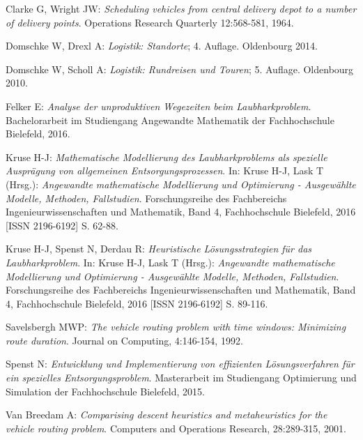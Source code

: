 \documentclass[fontsize=12pt,doubleside,openany,listof=totoc,listof=flat,listof=nochaptergap,numbers=noenddot]{scrbook}
\theoremstyle{style}
\begin{document}
\begin{thebibliography}{16}


 Clarke G, Wright JW: \textit{Scheduling vehicles from central delivery depot to a number of delivery points}. Operations Research Quarterly 12:568-581, 1964.

 Domschke W, Drexl A: \textit{Logistik: Standorte}; 4. Auflage. Oldenbourg 2014.

 Domschke W, Scholl A: \textit{Logistik: Rundreisen und Touren}; 5. Auflage. Oldenbourg 2010.

 Felker E: \textit{Analyse der unproduktiven Wegezeiten beim Laubharkproblem}. Bachelorarbeit im Studiengang Angewandte Mathematik der Fachhochschule Bielefeld, 2016.

 Kruse H-J: \textit{Mathematische Modellierung des Laubharkproblems als spezielle Ausprägung von allgemeinen Entsorgungsprozessen}. In: Kruse H-J, Lask T (Hrsg.): \textit{Angewandte mathematische Modellierung und Optimierung - Ausgewählte Modelle, Methoden, Fallstudien}. Forschungsreihe des Fachbereichs Ingenieurwissenschaften und Mathematik, Band 4, Fachhochschule Bielefeld, 2016 [ISSN 2196-6192] S. 62-88.

 Kruse H-J, Spenst N, Derdau R: \textit{Heuristische Lösungsstrategien für das Laubharkproblem}. In: Kruse H-J, Lask T (Hrsg.): \textit{Angewandte mathematische Modellierung und Optimierung - Ausgewählte Modelle, Methoden, Fallstudien}. Forschungsreihe des Fachbereichs Ingenieurwissenschaften und Mathematik, Band 4, Fachhochschule Bielefeld, 2016 [ISSN 2196-6192] S. 89-116.

 Savelsbergh MWP: \textit{The vehicle routing problem with time windows: Minimizing route duration}. Journal on Computing, 4:146-154, 1992.

 Spenst N: \textit{Entwicklung und Implementierung von effizienten Lösungsverfahren für ein spezielles Entsorgungsproblem}. Masterarbeit im Studiengang Optimierung und Simulation der Fachhochschule Bielefeld, 2015.

 Van Breedam A: \textit{Comparising descent heuristics and metaheuristics for the vehicle routing problem}. Computers and Operations Research, 28:289-315, 2001.

\end{thebibliography}
\end{document}
